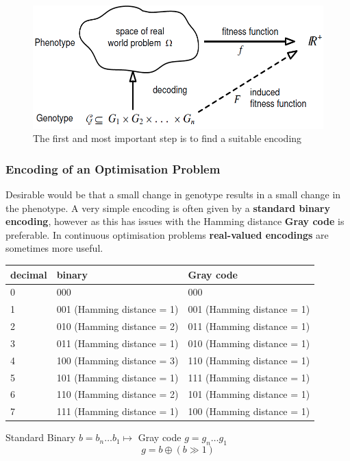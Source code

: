 \documentclass[11pt]{article}
\begin{document}
\begin{figure}[H]
	\centering
	\includegraphics[width=0.6\linewidth]{img/genetic_algorithm_encoding_problem}
	\caption{The first and most important step is to find a suitable encoding}
	\label{fig:geneticalgorithmencodingproblem}
\end{figure}

\subsubsection{Encoding of an Optimisation Problem}
Desirable would be that a small change in genotype results in a small change in the phenotype. A very simple encoding is often given by a \textbf{standard binary encoding}, however as this has issues with the Hamming distance \textbf{Gray code} is preferable. In continuous optimisation problems \textbf{real-valued encodings} are sometimes more useful.

\vspace{1em}
\noindent
\begin{tabularx}{\linewidth}{|l|X|X|}
	\hline
	decimal & binary & Gray code\\
	\hline
	0 & 000 & 000\\
	1 & 001 (Hamming distance = 1) & 001 (Hamming distance = 1)\\
	2 & 010 (Hamming distance = 2) & 011 (Hamming distance = 1)\\
	3 & 011 (Hamming distance = 1) & 010 (Hamming distance = 1)\\
	4 & 100 (Hamming distance = 3) & 110 (Hamming distance = 1)\\
	5 & 101 (Hamming distance = 1) & 111 (Hamming distance = 1)\\
	6 & 110 (Hamming distance = 2) & 101 (Hamming distance = 1)\\
	7 & 111 (Hamming distance = 1) & 100 (Hamming distance = 1)\\
	\hline
\end{tabularx}

\vspace{1em}
\noindent
Standard Binary $b=b_n\dots b_1 \mapsto$ Gray code $ g= g_n\dots g_1$
\begin{equation*}
	g= b \oplus (b \gg 1)
\end{equation*}
\end{document}
